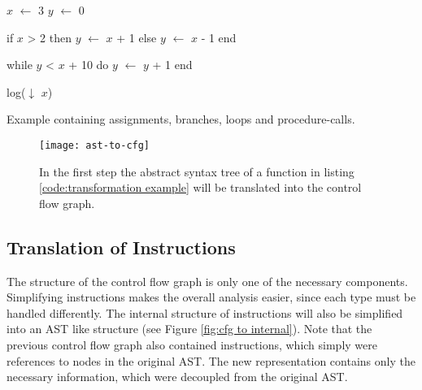\begin{program}
	\begin{GenericCode}
$x$ $\leftarrow$ 3
$y$ $\leftarrow$ 0
		
if $x$ > 2 then
	$y$ $\leftarrow$ $x$ + 1
else
	$y$ $\leftarrow$ $x$ - 1
end
		
while $y$ < $x$ + 10 do
	$y$ $\leftarrow$ $y$ + 1
end
		
log($\downarrow$ $x$)\end{GenericCode}
	\caption{Example containing assignments, branches, loops and procedure-calls. }
	\label{code:transformation example}
\end{program}

\begin{figure}
	\centering
	\texttt{[image: ast-to-cfg]}
	\caption{In the first step the abstract syntax tree of a function in listing \ref{code:transformation example} will be translated into the control flow graph.}
	\label{fig:ast to cfg}
\end{figure}


\subsection{Translation of Instructions}
\label{subsec:translate instructions}
The structure of the control flow graph is only one of the necessary components. 
Simplifying instructions makes the overall analysis easier, since each type must be handled differently.
The internal structure of instructions will also be simplified into an AST like structure (see Figure \ref{fig:cfg to internal}). 
Note that the previous control flow graph also contained instructions, which simply were references to nodes in the original AST. 
The new representation contains only the necessary information, which were decoupled from the original AST.

